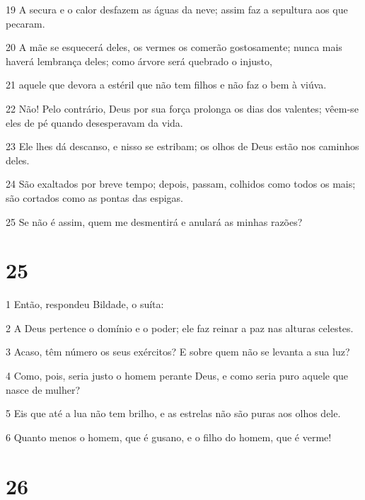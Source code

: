 \par 19 A secura e o calor desfazem as águas da neve; assim faz a sepultura aos que pecaram.
\par 20 A mãe se esquecerá deles, os vermes os comerão gostosamente; nunca mais haverá lembrança deles; como árvore será quebrado o injusto,
\par 21 aquele que devora a estéril que não tem filhos e não faz o bem à viúva.
\par 22 Não! Pelo contrário, Deus por sua força prolonga os dias dos valentes; vêem-se eles de pé quando desesperavam da vida.
\par 23 Ele lhes dá descanso, e nisso se estribam; os olhos de Deus estão nos caminhos deles.
\par 24 São exaltados por breve tempo; depois, passam, colhidos como todos os mais; são cortados como as pontas das espigas.
\par 25 Se não é assim, quem me desmentirá e anulará as minhas razões?

\chapter{25}

\par 1 Então, respondeu Bildade, o suíta:
\par 2 A Deus pertence o domínio e o poder; ele faz reinar a paz nas alturas celestes.
\par 3 Acaso, têm número os seus exércitos? E sobre quem não se levanta a sua luz?
\par 4 Como, pois, seria justo o homem perante Deus, e como seria puro aquele que nasce de mulher?
\par 5 Eis que até a lua não tem brilho, e as estrelas não são puras aos olhos dele.
\par 6 Quanto menos o homem, que é gusano, e o filho do homem, que é verme!

\chapter{26}

